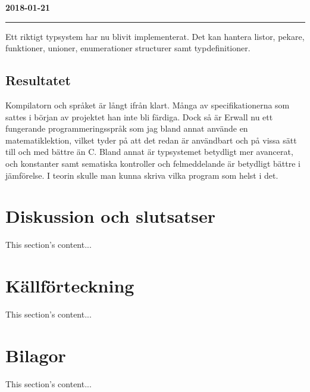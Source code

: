 \documentclass{theme}
\begin{document}
\noindent\textbf{2018-01-21}\\
\noindent\rule{\textwidth}{1pt}

\noindent 
Ett riktigt typsystem har nu blivit implementerat. Det kan hantera listor, 
pekare, funktioner, unioner, enumerationer structurer samt typdefinitioner.\\

\subsection{Resultatet}

Kompilatorn och språket är långt ifrån klart. Många av specifikationerna som 
sattes i början av projektet han inte bli färdiga. Dock så är Erwall nu ett 
fungerande programmeringsspråk som jag bland annat använde en matematiklektion,
vilket tyder på att det redan är användbart och på vissa sätt till och med 
bättre än C. Bland annat är typsystemet betydligt mer avancerat, och konstanter
samt sematiska kontroller och felmeddelande är betydligt bättre i jämförelse. I 
teorin skulle man kunna skriva vilka program som helst i det. 

\section{Diskussion och slutsatser}
This section's content...

\section{Källförteckning}
This section's content...

\section{Bilagor}
This section's content...
\end{document}
